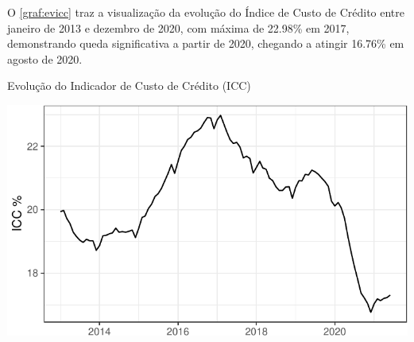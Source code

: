 \documentclass[
  12pt,
  12pt,
  openright,
  oneside,
  a4paper,
  chapter=TITLE,
  section=TITLE,
  subsection=TITLE,
  subsubsection=TITLE,
  english,
  portugues,
  sumario=tradicional]{abntex2}
\begin{document}
O \autoref{graf:evicc} traz a visualização da evolução do Índice de Custo de Crédito entre janeiro de 2013 e dezembro de 2020, com máxima de 22.98\% em 2017, demonstrando queda significativa a partir de 2020, chegando a atingir 16.76\% em agosto de 2020.

\begin{grafico}[!hbtp]
\vspace{20pt}
\caption{Evolução do Indicador de Custo de Crédito (ICC)}
\vspace{-4mm}

\begin{center}\includegraphics{12-exportedfigures/ICC-1} \end{center}
\vspace{-3mm}
\label{graf:evicc}
\vspace{-2mm}
\end{grafico}
\end{document}
